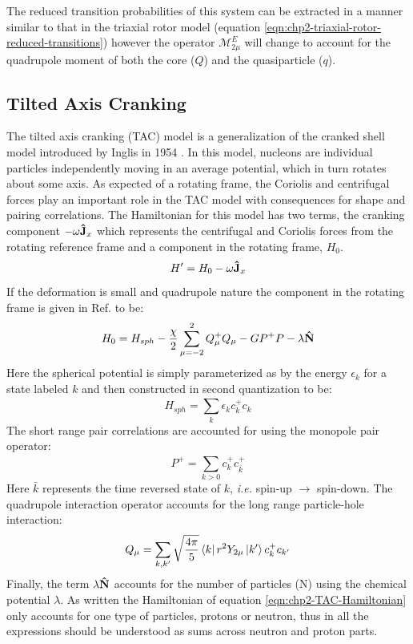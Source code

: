The reduced transition probabilities of this system can be extracted in a manner similar to that in the triaxial rotor model (equation \ref{eqn:chp2-triaxial-rotor-reduced-transitions}) however the operator $\mathcal{M}^E_{2\mu}$ will change to account for the quadrupole moment of both the core ($Q$) and the quasiparticle ($q$).

\subsection{Tilted Axis Cranking}
\label{sec:models-tac}
The tilted axis cranking (TAC) model \cite{frauendorfTAC} is a generalization of the cranked shell model introduced by Inglis in 1954 \cite{crankedShellModel}. In this model, nucleons are individual particles independently moving in an average potential, which in turn rotates about some axis. As expected of a rotating frame, the Coriolis and centrifugal forces play an important role in the TAC model with consequences for shape and pairing correlations. The Hamiltonian for this model has two terms, the cranking component $-\omega\boldsymbol{\hat{\textbf{J}}}_x$ which represents the centrifugal and Coriolis forces from the rotating reference frame and a component in the rotating frame, $H_0$.
\begin{equation}
\label{eqn:chp2-TAC-Hamiltonian}
H'=H_0-\omega\boldsymbol{\hat{\textbf{J}}}_x
\end{equation}
If the deformation is small and quadrupole nature the component in the rotating frame is given in Ref. \cite{frauendorfTAC} to be:
\begin{equation}
\label{eqn:chp2-TAC-invar-Hamiltonian}
H_0=H_{sph}-\frac{\chi}{2}\sum\limits_{\mu=-2}^{2}Q_{\mu}^+Q_{\mu} - GP^+P-\lambda\boldsymbol{\hat{\textbf{N}}}
\end{equation}
Here the spherical potential is simply parameterized as by the energy $\epsilon_k$ for a state labeled $k$ and then constructed in second quantization to be:
\begin{equation}
\label{eqn:chp2-TAC-spherical}
H_{sph}=\sum\limits_{k}^{}\epsilon_kc^+_kc_k
\end{equation}
The short range pair correlations are accounted for using the monopole pair operator:
\begin{equation}
\label{eqn:chp2-TAC-pairing}
P^+=\sum\limits_{k>0}^{}c^+_kc^+_{\bar{k}}
\end{equation}
Here $\bar{k}$ represents the time reversed state of $k$, \emph{i.e.} spin-up $\rightarrow$ spin-down. The quadrupole interaction operator accounts for the long range particle-hole interaction:
\begin{equation}
\label{eqn:chp2-TAC-quad}
Q_{\mu}=\sum\limits_{k,k'}^{}\sqrt{\frac{4\pi}{5}}\Bra{k}r^2Y_{2\mu}\Ket{k'}c^+_kc_{k'}
\end{equation}
Finally, the term $\lambda\boldsymbol{\hat{\textbf{N}}}$ accounts for the number of particles (N) using the chemical potential $\lambda$. As written the Hamiltonian of equation \ref{eqn:chp2-TAC-Hamiltonian} only accounts for one type of particles, protons or neutron, thus in all the expressions should be understood as sums across neutron and proton parts.

